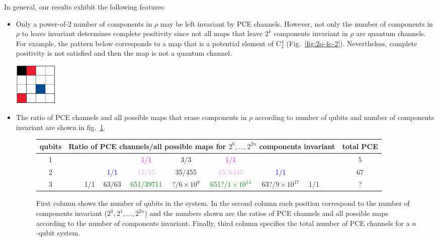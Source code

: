 \documentclass[11pt,dvipsnames]{article} %
\newcommand{\fref}[1]{fig.~\ref{#1}}  \newcommand{\tref}[1]{table~\ref{#1}}
\newcommand{\Fref}[1]{Fig.~\ref{#1}}  \newcommand{\Tref}[1]{Table~\ref{#1}}
\newcommand{\1}{\mathds{1}}
\begin{document}
In general, our results exhibit the following features:
\begin{itemize}
\item Only a power-of-2 number of components in $\rho$ 
may be left invariant by PCE 
channels. However, not only the number of components in $\rho$ 
to leave invariant determines complete positivity since
not all maps that leave $2^{k}$ components invariant in $\rho$
are quantum channels. For example, the pattern below corresponds 
to a map that is a potential element of C${}_2^4$ (\Fref{fig:2q-4c-2}).
Nevertheless, complete positivity is not satisfied 
and then the map is not a quantum channel. 
\begin{center}
	\includegraphics[height=2cm]{img/not-cc}
\end{center}

\item 
The ratio of PCE channels and all possible maps
that erase components in $\rho$ according to number of qubits 
and number of components
invariant are shown in \fref{fig:CCs-by-components}.



\begin{figure}[H]%
\centering	
\footnotesize
\begin{tabular}{c|ccccccccccc|c}
qubits  & \multicolumn{11}{c|}{Ratio of PCE channels/all possible maps for 
$2^0,\ldots,2^{2n}$ components invariant} & total PCE \\
\hline
1 &&&&&\textcolor{Magenta}{1/1}&3/3&\textcolor{Magenta}{1/1}&&&&&5\\
2 &&&&\textcolor{Blue}{1/1}&\textcolor{Plum}{15/15}&35/455&
\textcolor{Plum}{15/6435}&\textcolor{Blue}{1/1}&&&&67\\
3 &&&\textcolor{BrickRed}{1/1}&\textcolor{YellowOrange}{63/63}&
\textcolor{Green}{651/39711}&
?/$6\times 10^8$&
\textcolor{Green}{651?/${1\times 10^{14}}$}&
\textcolor{YellowOrange}{63?/${9\times 10^{17}}$}&
\textcolor{BrickRed}{1/1}&&&?
\end{tabular}
\caption{First column shows the number of qubits in the system.  In the second
column each position correspond to the number of components invariant ($2^0,
2^1, \ldots, 2^{2n}$) and the numbers shown are the ratios of PCE channels
and all possible maps according to the number of components invariant.  Finally, third column
specifies the total number of PCE channels for a $n$-qubit system.}
\label{fig:CCs-by-components}
\end{figure} %


\end{itemize}
\end{document}
